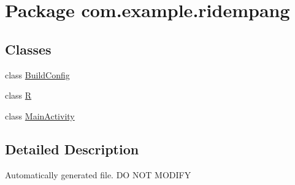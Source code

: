 \hypertarget{namespacecom_1_1example_1_1ridempang}{\section{Package com.\-example.\-ridempang}
\label{namespacecom_1_1example_1_1ridempang}
}
\subsection*{Classes}
\begin{DoxyCompactItemize}
\item 
class \hyperlink{classcom_1_1example_1_1ridempang_1_1_build_config}{Build\-Config}
\item 
class \hyperlink{classcom_1_1example_1_1ridempang_1_1_r}{R}
\item 
class \hyperlink{classcom_1_1example_1_1ridempang_1_1_main_activity}{Main\-Activity}
\end{DoxyCompactItemize}


\subsection{Detailed Description}
Automatically generated file. D\-O N\-O\-T M\-O\-D\-I\-F\-Y 